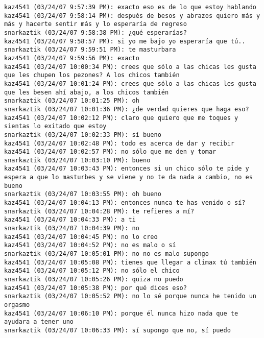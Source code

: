 \begin{verbatim}
kaz4541 (03/24/07 9:57:39 PM): exacto eso es de lo que estoy hablando
kaz4541 (03/24/07 9:58:14 PM): después de besos y abrazos quiero más y más y hacerte sentir más y lo esperaría de regreso
snarkaztik (03/24/07 9:58:38 PM): ¿qué esperarías?
kaz4541 (03/24/07 9:58:57 PM): si yo me bajo yo esperaría que tú..
snarkaztik (03/24/07 9:59:51 PM): te masturbara
kaz4541 (03/24/07 9:59:56 PM): exacto
kaz4541 (03/24/07 10:00:34 PM): crees que sólo a las chicas les gusta que les chupen los pezones? A los chicos también
kaz4541 (03/24/07 10:01:24 PM): crees que sólo a las chicas les gusta que les besen ahí abajo, a los chicos también
snarkaztik (03/24/07 10:01:25 PM): oh
snarkaztik (03/24/07 10:01:36 PM): ¿de verdad quieres que haga eso?
kaz4541 (03/24/07 10:02:12 PM): claro que quiero que me toques y sientas lo exitado que estoy
snarkaztik (03/24/07 10:02:33 PM): sí bueno
kaz4541 (03/24/07 10:02:48 PM): todo es acerca de dar y recibir
kaz4541 (03/24/07 10:02:57 PM): no sólo que me den y tomar
snarkaztik (03/24/07 10:03:10 PM): bueno
kaz4541 (03/24/07 10:03:43 PM): entonces si un chico sólo te pide y espera a que lo masturbes y se viene y no te da nada a cambio, no es bueno
snarkaztik (03/24/07 10:03:55 PM): oh bueno
kaz4541 (03/24/07 10:04:13 PM): entonces nunca te has venido o sí?
snarkaztik (03/24/07 10:04:28 PM): te refieres a mí?
kaz4541 (03/24/07 10:04:33 PM): a ti
snarkaztik (03/24/07 10:04:39 PM): no
kaz4541 (03/24/07 10:04:45 PM): no lo creo
kaz4541 (03/24/07 10:04:52 PM): no es malo o sí
snarkaztik (03/24/07 10:05:01 PM): no no es malo supongo
kaz4541 (03/24/07 10:05:08 PM): tienes que llegar a climax tú también
kaz4541 (03/24/07 10:05:12 PM): no sólo el chico
snarkaztik (03/24/07 10:05:26 PM): quiza no puedo
kaz4541 (03/24/07 10:05:38 PM): por qué dices eso?
snarkaztik (03/24/07 10:05:52 PM): no lo sé porque nunca he tenido un orgasmo
kaz4541 (03/24/07 10:06:10 PM): porque él nunca hizo nada que te ayudara a tener uno
snarkaztik (03/24/07 10:06:33 PM): sí supongo que no, sí puedo


\end{verbatim}
